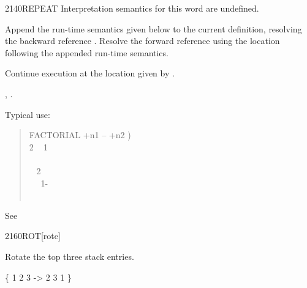 \begin{worddef}{2140}{REPEAT}
\interpret
	Interpretation semantics for this word are undefined.

\compile

	Append the run-time semantics given below to the current
	definition, resolving the backward reference .
	Resolve the forward reference  using the location
	following the appended run-time semantics.

\runtime
	\stack{}{}

	Continue execution at the location given by .

\see {},
	.

	\begin{defer}
	\rationale %
		Typical use:
		\begin{quote}\ttfamily
			\word{:} FACTORIAL  +n1 -- +n2 ) \\
			\tab {} 2  ~
				 1 ~  \\
			\tab {} \\
			\tab {}~  2   \\
			\tab~~ 1- ~  \word{*}~  \\
			\tab {}  \\
			\word{;}
		\end{quote}

	\testing*
		See 
	\end{defer}
\end{worddef}


\begin{worddef}{2160}{ROT}[rote]
\item {}

	Rotate the top three stack entries.

	\begin{defer}
	\testing
		\{ 1 2 3  -> 2 3 1 \}
	\end{defer}
\end{worddef}


